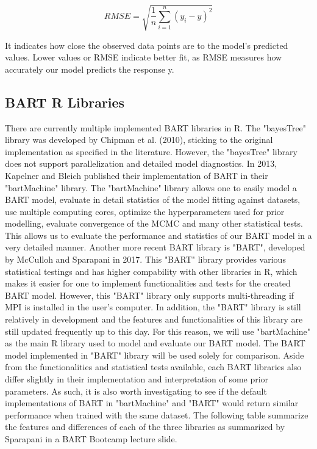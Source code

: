 \documentclass{usiinftr}
\begin{document}
\begin{equation}
R M S E=\sqrt{\frac{1}{n} \sum_{i=1}^{n}\left(y_{i}-\hat{y}\right)^{2}}
\end{equation}

It indicates how close the observed data points are to the model's predicted values. Lower values or RMSE indicate better fit, as RMSE measures how accurately our model predicts the response y.  

\subsection{BART R Libraries}
There are currently multiple implemented BART libraries in R. The "bayesTree" library was developed by Chipman et al. (2010), sticking to the original implementation as specified in the literature. However, the "bayesTree" library does not support parallelization and detailed model diagnostics. In 2013, Kapelner and Bleich published their implementation of BART in their "bartMachine" library. The "bartMachine" library allows one to easily model a BART model, evaluate in detail statistics of the model fitting against datasets, use multiple computing cores, optimize the hyperparameters used for prior modelling, evaluate convergence of the MCMC and many other statistical tests. This allows us to evaluate the performance and statistics of our BART model in a very detailed manner. Another more recent BART library is "BART", developed by McCulloh and Sparapani in 2017. This "BART" library provides various statistical testings and has higher compability with other libraries in R, which makes it easier for one to implement functionalities and tests for the created BART model. However, this "BART" library only supports multi-threading if MPI is installed in the user's computer. In addition, the "BART" library is still relatively in development and the features and functionalities of this library are still updated frequently up to this day. For this reason, we will use "bartMachine" as the main R library used to model and evaluate our BART model. The BART model implemented in "BART" library will be used solely for comparison. Aside from the functionalities and statistical tests available, each BART libraries also differ slightly in their implementation and interpretation of some prior parameters. As such, it is also worth investigating to see if the default implementations of BART in "bartMachine" and "BART" would return similar performance when trained with the same dataset. The following table summarize the features and differences of each of the three libraries as summarized by Sparapani in a BART Bootcamp lecture slide.
\end{document}

